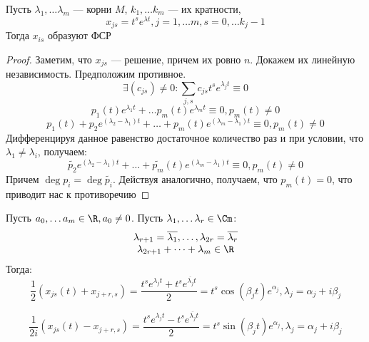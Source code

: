 \begin{theorem}
    Пусть \(\lambda_1, \dots \lambda_m\) --- корни \(M\), \(k_1, \dots k_m\) --- их кратности, 
    \[x_{js} = t^se^{\lambda t}, j = 1, \dots m, s = 0, \dots k_j - 1\]
    Тогда \(x_{is}\) образуют ФСР
\end{theorem}
\begin{proof}
    Заметим, что \(x_{js}\) --- решение, причем их ровно \(n\). Докажем их линейную независимость. Предположим противное.
    \[\exists (c_{js}) \ne 0: \sum_{j, s} c_{js}t^se^{\lambda_j t} \equiv 0\]
    \[p_1(t)e^{\lambda_1 t} + \dots p_m(t)e^{\lambda_m t} \equiv 0, p_m(t) \ne 0\]
    \[p_1(t) + p_2e^{(\lambda_2 - \lambda_1)t} + \dots + p_m(t)e^{(\lambda_m - \lambda_1)t} \equiv 0, p_m(t) \ne 0\]
    Дифференцируя данное равенство достаточное количество раз и при условии, что \(\lambda_1 \ne \lambda_i\), получаем:
    \[\tilde{p_2}e^{(\lambda_2 - \lambda_1)t} + \dots + \tilde{p_m}(t)e^{(\lambda_m - \lambda_1)t} \equiv 0, p_m(t) \ne 0\]
    Причем \(\deg p_i = \deg \tilde{p_i}\). 
    Действуя аналогично, получаем, что \(p_m(t) = 0\), что приводит нас к противоречию
\end{proof}

Пусть \(a_0, \dots a_m \in \R, a_0 \ne 0\). Пусть \(\lambda_1, \dots \lambda_r \in \Cm\):
\[\begin{array}{c}
    \lambda_{r + 1} = \overline{\lambda_1}, \dots, \lambda_{2r} = \overline{\lambda_r} \\
    \lambda_{2r + 1} + \dots + \lambda_m \in \R
\end{array}\]
Тогда:
\[\frac{1}{2}\left( x_{js}(t) + x_{j + r, s} \right) = \frac{t^se^{\lambda_j t} + t^s e^{\overline{\lambda_j}t}}{2} = t^s \cos (\beta_j t)e^{\alpha_j}, \lambda_j = \alpha_j + i\beta_j\]

\[\frac{1}{2i}\left( x_{js}(t) - x_{j + r, s} \right) = \frac{t^se^{\lambda_j t} - t^s e^{\overline{\lambda_j}t}}{2} = t^s \sin (\beta_j t)e^{\alpha_j}, \lambda_j = \alpha_j + i\beta_j\]

